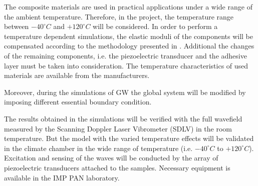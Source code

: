 \documentclass[a4paper,12pt]{article}
\begin{document}
The composite materials are used in practical applications under a wide range of the ambient temperature. Therefore, in the project, the temperature range between $-40^{\circ} C$ and $+120^{\circ} C$ will be considered. In order to perform a temperature dependent simulations, the elastic moduli of the components will be compensated \cite{sikdar2018study,sikdar2018effects} according to the methodology presented in \cite{chamis1983simplified, salamone2009guided}. Additional the changes of the remaining components, i.e. the piezoelectric transducer and the adhesive layer must be taken into consideration. The temperature characteristics of used materials are available from the manufacturers.

Moreover, during the simulations of GW the global system will be modified by imposing different essential boundary condition.

The results obtained in the simulations will be verified with the full wavefield measured by the Scanning Doppler Laser Vibrometer (SDLV) in the room temperature. But the model with the varied temperature effects will be validated in the climate chamber in the wide range of temperature (i.e. $-40^{\circ} C$ to $+120^{\circ} C$). Excitation and sensing of the waves will be conducted by the array of piezoelectric transducers attached to the samples. Necessary equipment is available in the IMP PAN laboratory.

{}
\end{document}
